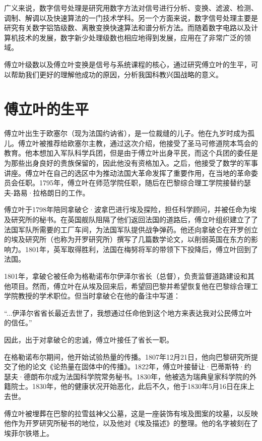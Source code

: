 \documentclass{../source/Paper}
\date{\today}
\begin{document}
\makeheader

广义来说，数字信号处理是研究用数字方法对信号进行分析、变换、滤波、检测、调制、解调以及快速算法的一门技术学科。另一个方面来说，数字信号处理主要是研究有关数字铝箔级数、离散变换快速算法和谱分析方法。而随着数字电路以及计算机技术的发展，数字新少处理级数也相应地得到发展，应用在了非常广泛的领域。

傅立叶级数以及傅立叶变换是信号与系统课程的核心，通过研究傅立叶的生平，可以帮助我们更好的理解他成功的原因，分析我国科教兴国战略的意义。

\section{傅立叶的生平}

傅立叶出生于欧塞尔（现为法国约讷省），是一位裁缝的儿子。他在九岁时成为孤儿。傅立叶被推荐给欧塞尔主教，通过这次介绍，他接受了圣马可修道院本笃会的教育。他本想加入军队科学兵团，但是由于傅立叶出身平民，而这个兵团的委任是为那些出身良好的贵族保留的，因此他没有资格加入。之后，他接受了数学的军事讲座。傅立叶在自己的选区中为推动法国大革命发挥了重要作用，在当地的革命委员会任职。1795年，傅立叶在师范学院任职，随后在巴黎综合理工学院接替约瑟夫-路易·拉格朗日的工作。

傅立叶于1798年陪同拿破仑·波拿巴进行埃及探险，担任科学顾问，并被任命为埃及研究所的秘书。在英国舰队阻隔了他们返回法国的道路后，傅立叶组织建立了了法国军队所需要的工厂车间，为法国军队提供战争弹药。他还向拿破仑在开罗创立的埃及研究所（也称为开罗研究所）撰写了几篇数学论文，以削弱英国在东方的影响力。1801年，英军取得胜利，法国在梅努将军的带领下下投降后，傅立叶回到了法国。

1801年，拿破仑被任命为格勒诺布尔伊泽尔省长（总督），负责监督道路建设和其他项目。然而，傅立叶在从埃及回来后，希望回巴黎并希望恢复他在巴黎综合理工学院教授的学术职位。但当时拿破仑在他的备注中写道：

“...伊泽尔省省长最近去世了，我想通过任命他到这个地方来表达我对公民傅立叶的信任。”

因此，出于对拿破仑的忠诚，傅立叶接任了省长一职。

在格勒诺布尔期间，他开始试验热量的传播。1807年12月21日，他向巴黎研究所提交了他的论文《论热量在固体中的传播》。1822年，傅立叶接替让·巴蒂斯特·约瑟夫·德朗布尔成为法国科学院常务秘书。1830年，他被选为瑞典皇家科学院的外籍院士。1830年，他的健康状况开始恶化，此后不久，他于1830年5月16日在床上去世。

傅立叶被埋葬在巴黎的拉雪兹神父公墓，这是一座装饰有埃及图案的坟墓，以反映他作为开罗研究所秘书的地位，以及他对《埃及描述》的整理。他的名字被刻在了埃菲尔铁塔上。
\end{document}
